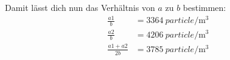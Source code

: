\documentclass[12pt,a4paper,bibtotocnumbered,liststotocnumbered]{scrreprt}
\begin{document}
Damit lässt dich nun das Verhältnis von $a$ zu $b$ bestimmen:
\begin{align}
\frac{a1}{b} &=   \SI{3364}{particle\per\cubic\meter} \\
\frac{a2}{b} &=   \SI{4206}{particle\per\cubic\meter}  \\
\frac{a1 + a2}{2 b} &=   \SI{3785}{particle\per\cubic\meter} 
\end{align}






\newpage
\RaggedRight



\listoffigures

\listoftables
\end{document}
